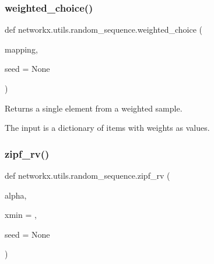 \subsubsection{\texorpdfstring{weighted\+\_\+choice()}{weighted\_choice()}}
{\footnotesize\ttfamily def networkx.\+utils.\+random\+\_\+sequence.\+weighted\+\_\+choice (\begin{DoxyParamCaption}\item[{}]{mapping,  }\item[{}]{seed = {\ttfamily None} }\end{DoxyParamCaption})}

\begin{DoxyVerb}Returns a single element from a weighted sample.

The input is a dictionary of items with weights as values.
\end{DoxyVerb}
 \mbox{\label{namespacenetworkx_1_1utils_1_1random__sequence_a08968e4ec4cbbb119b4d22d415a4186b}} 
\subsubsection{\texorpdfstring{zipf\+\_\+rv()}{zipf\_rv()}}
{\footnotesize\ttfamily def networkx.\+utils.\+random\+\_\+sequence.\+zipf\+\_\+rv (\begin{DoxyParamCaption}\item[{}]{alpha,  }\item[{}]{xmin = {},  }\item[{}]{seed = {\ttfamily None} }\end{DoxyParamCaption})}

